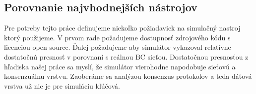 \subsection{Porovnanie najvhodnejších nástrojov}

\begin{table}[tb]
	\caption{Matica podporovaných vlastností zvolených simulátorov na sieťovej, konsenzus a dátovej vrstve.}
	\label{tab:sim-layers}
\end{table}

Pre potreby tejto práce definujeme niekoľko požiadaviek na simulačný nastroj ktorý použijeme. V prvom rade požadujeme dostupnosť zdrojového kódu s licenciou open source. Ďalej požadujeme aby simulátor vykazoval relatívne dostatočnú presnosť v porovnaní s reálnou BC sieťou. Dostatočnou presnosťou z hľadiska našej práce sa myslí, že simulátor vierohodne napodobuje sieťovú a konsenzuálnu vrstvu. Zaoberáme sa analýzou konsenzus protokolov a teda dátová vrstva už nie je pre simuláciu kľúčová. 

